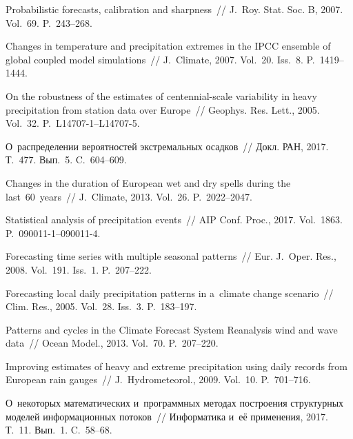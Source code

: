 \begin{multicols}{2}
{{\begin{thebibliography}{99}
 Probabilistic
forecasts, calibration and sharpness~// J.~Roy. Stat. Soc. B, 2007. Vol.~69. P.~243--268.

Changes in temperature and precipitation extremes in the IPCC ensemble of global
coupled model simulations~// J.~Climate, 2007. Vol.~20. Iss.~8. P.~1419--1444.

 On the
robustness of the estimates of centennial-scale variability in heavy precipitation from
station data over Europe~// Geophys. Res. Lett., 2005. Vol.~32. P.~L14707-1--L14707-5.

 О~распределении
вероятностей экстремальных осадков~// Докл. РАН, 2017. Т.~477.
Вып.~5. C.~604--609.

Changes in the duration of European wet and dry spells during the last~60~years~// 
J.~Climate, 2013. Vol.~26. P.~2022--2047.



 Statistical analysis of precipitation events~// AIP
Conf. Proc., 2017. Vol.~1863. P.~090011-1--090011-4.

 Forecasting time series with multiple seasonal
patterns~// Eur. J.~Oper. Res., 2008. Vol.~191. Iss.~1.
P.~207--222.

 Forecasting local daily precipitation patterns
in a~climate change scenario~// Clim. Res., 2005. Vol.~28. Iss.~3. P.~183--197.

Patterns and cycles in the Climate Forecast System Reanalysis wind and wave data~//
Ocean Model., 2013. Vol.~70. P.~207--220.

Improving estimates of heavy and extreme precipitation using daily records from
European rain gauges~// J.~Hydrometeorol., 2009. Vol.~10. P.~701--716.

 О~некоторых математических 
и~программных методах построения структурных моделей информационных
потоков~// Информатика и~её применения, 2017. Т.~11. Вып.~1. C.~58--68.


\end{thebibliography}}}
\end{multicols}
